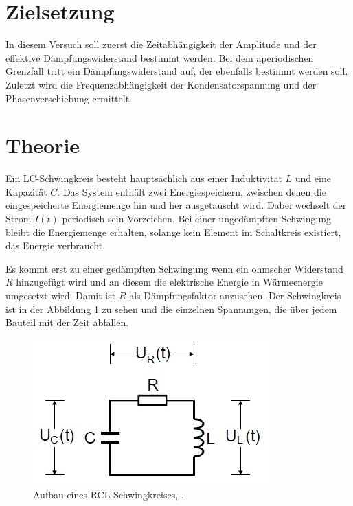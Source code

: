 \section{Zielsetzung}
\label{sec:Zielsetzung}
In diesem Versuch soll zuerst die Zeitabhängigkeit der Amplitude und der effektive Dämpfungswiderstand bestimmt werden. Bei dem aperiodischen Grenzfall tritt ein Dämpfungswiderstand auf, der ebenfalls bestimmt werden soll. Zuletzt wird die Frequenzabhängigkeit der Kondensatorspannung und der Phasenverschiebung ermittelt. 
\section{Theorie}
\label{sec:Theorie}
Ein LC-Schwingkreis besteht hauptsächlich aus einer Induktivität $L$ und eine Kapazität $C$. Das System enthält zwei Energiespeichern, zwischen denen die eingespeicherte Energiemenge hin und her ausgetauscht wird. Dabei wechselt der Strom $I(t)$ periodisch sein Vorzeichen. 
Bei einer ungedämpften Schwingung bleibt die Energiemenge erhalten, solange kein Element im Schaltkreis existiert, das Energie verbraucht. 

Es kommt erst zu einer gedämpften Schwingung wenn ein ohmscher Widerstand $R$ hinzugefügt wird und an diesem die elektrische Energie in Wärmeenergie umgesetzt wird. Damit ist $R$ als Dämpfungsfaktor anzusehen. Der Schwingkreis ist in der Abbildung \ref{fig:schwingkreisrcl} zu sehen und die einzelnen Spannungen, die über jedem Bauteil mit der Zeit abfallen. 
\begin{figure}[h!]
	\centering
	\includegraphics[width=0.5\linewidth]{SchwingkreisRCL.jpg}
	\caption{Aufbau eines RCL-Schwingkreises, \cite[1]{anleitung354}.}
	\label{fig:schwingkreisrcl}
\end{figure}
 
